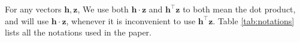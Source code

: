 \documentclass{article}
\theoremstyle{plain}
\newtheorem{theorem}{Theorem}[section]
\theoremstyle{definition}
\theoremstyle{remark}
\newcommand{\R}{{\mathbb R}}
\newcommand{\1}{{\mathbf 1}}
\newcommand{\0}{{\mathbf 0}}
\newcommand{\h}{{\mathbf h}}
\newcommand{\z}{{\mathbf z}}
\newcommand{\g}{{\mathbf g}}
\newcommand{\x}{{\mathbf x}}
\newcommand{\blambda}{{\boldsymbol \lambda}}
\renewcommand{\>}{{\rightarrow}}
\begin{document}

%
%
%    

For any vectors $\h,\z$, We use both $\h \cdot \z$ and $\h^\top \z$ to both mean the dot product, and will use $\h \cdot \z$, whenever it is inconvenient to use $\h^\top \z$. Table \ref{tab:notations} lists all the notations used in the paper.
\end{document}
